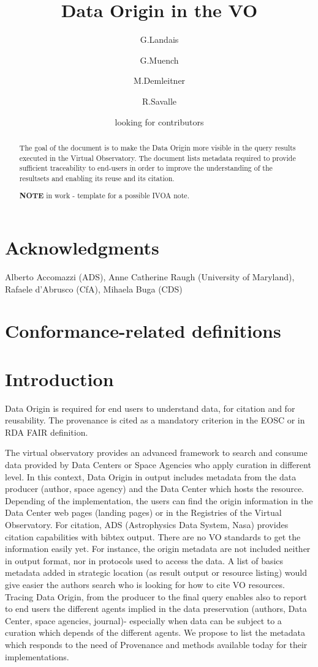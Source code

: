 \documentclass[11pt,a4paper]{ivoa}
\title{Data Origin in the VO}
\author{G.Landais}
\author{G.Muench}
\author{M.Demleitner}
\author{R.Savalle}
\author{looking for contributors}
\begin{document}
\begin{abstract}
The goal of the document is to make the Data Origin more visible in the query results executed in the Virtual Observatory. 
The document lists metadata required to provide sufficient traceability to end-users in order to improve the understanding 
of the resultsets and enabling its reuse and its citation.

\textbf{NOTE} in work -  template for a possible IVOA note.


\end{abstract}


\section*{Acknowledgments}
Alberto Accomazzi (ADS), Anne Catherine Raugh (University of Maryland), Rafaele d'Abrusco (CfA), Mihaela Buga (CDS)

\section*{Conformance-related definitions}


\section{Introduction}

Data Origin is required for end users to understand data, for citation and for reusability. The  provenance is cited as a mandatory criterion in the EOSC or in RDA FAIR definition. 

The virtual observatory provides an advanced framework to search and consume data provided by Data Centers or Space Agencies who apply curation in different level.  In this context, Data Origin in output includes metadata from the data producer (author, space agency) and the Data Center which hosts the resource. 
Depending of the implementation, the users can find the origin information in the Data Center web pages (landing pages) or in the Registries of the Virtual Observatory. For citation, ADS (Astrophysics Data System, Nasa) provides citation capabilities with bibtex output. There are no VO standards to get the information easily yet. For instance, the origin metadata are not included neither in output format, nor in protocols used to access the data.
A list of basics metadata added in strategic location (as result output or resource listing) would give easier the authors search who is looking for how to cite VO resources. Tracing Data Origin, from the producer to the final query enables also to report to end users the different agents implied in the data preservation (authors, Data Center, space agencies, journal)- especially when data can be subject to a curation  which depends of the different agents.
We propose to list the metadata which responds to the need of Provenance and methods available today for their implementations. 
\end{document}
